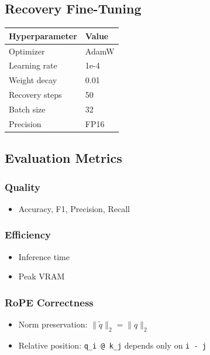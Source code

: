 {\subsection{Recovery Fine-Tuning}

\begin{table}[H]
\centering
\small
\begin{tabular}{ll}
\toprule
\textbf{Hyperparameter} & \textbf{Value} \\
\midrule
Optimizer & AdamW \\
Learning rate & 1e-4 \\
Weight decay & 0.01 \\
Recovery steps & 50 \\
Batch size & 32 \\
Precision & FP16 \\
\bottomrule
\end{tabular}
\end{table}

\subsection{Evaluation Metrics}

\subsubsection{Quality}
\begin{itemize}
\item Accuracy, F1, Precision, Recall

\end{itemize}
\subsubsection{Efficiency}
\begin{itemize}
\item Inference time
\item Peak VRAM

\end{itemize}
\subsubsection{RoPE Correctness}
\begin{itemize}
\item Norm preservation: $\|\tilde{q}\|_2 = \|q\|_2$
\item Relative position: \texttt{q\_i @ k\_j} depends only on \texttt{i - j}


\end{itemize}}
